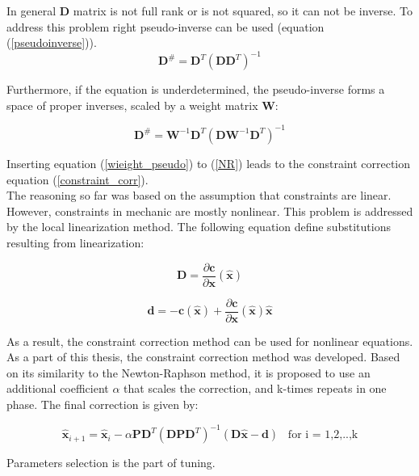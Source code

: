 In general $\bm{D}$ matrix is not full rank or is not squared, so it can not be inverse. To address this problem right pseudo-inverse can be used (equation (\ref{pseudoinverse})).
\begin{equation}
	\bm{D}^{\#} = \bm{D}^T \left( \bm{D} \bm{D}^T \right) ^ {-1}
	\label{pseudoinverse}
\end{equation}

Furthermore, if the equation is underdetermined, the pseudo-inverse forms a space of proper inverses, scaled by a weight matrix $\bm{W}$:

\begin{equation}
	\bm{D}^{\#} = \bm{W}^{-1} \bm{D}^T \left( \bm{D} \bm{W}^{-1} \bm{D}^T \right) ^ {-1}
	\label{wieight_pseudo}
\end{equation}

Inserting equation (\ref{wieight_pseudo}) to (\ref{NR}) leads to the constraint correction equation (\ref{constraint_corr}).\\

The reasoning so far was based on the assumption that constraints are linear. 
However, constraints in mechanic are mostly nonlinear. This problem is addressed by the local linearization method. The following equation define substitutions resulting from linearization:

\begin{equation}
	\bm{D} = \frac{\partial \bm{c}}{\partial \bm{x}}(\bm{\hat{x}})
	\label{linearization1}
\end{equation}

\begin{equation}
	\bm{d} =  - \bm{c} (\bm{\hat{x}}) +  \frac{\partial \bm{c}}{\partial \bm{x}}(\bm{\hat{x}}) \bm{\hat{x}}
	\label{linearization2}
\end{equation}

As a result, the constraint correction method can be used for nonlinear equations.\\ 

As a part of this thesis, the constraint correction method was developed. Based on its similarity to the Newton-Raphson method, it is proposed to use an additional coefficient $\alpha$ that scales the correction, and k-times repeats in one phase. The final correction is given by:

\begin{equation}
	\bm{\hat{x}}_{i+1} = \bm{\hat{x}}_{i} - \alpha \bm{P} \bm{D}^T \left( \bm{D} \bm{P} \bm{D}^T \right)^{-1} \left( \bm{D} \bm{\hat{x}} - \bm{d}  \right) \hspace{10pt} \text{for i = 1,2,..,k}
	\label{constraint_final}
\end{equation}

 Parameters selection is the part of tuning.  